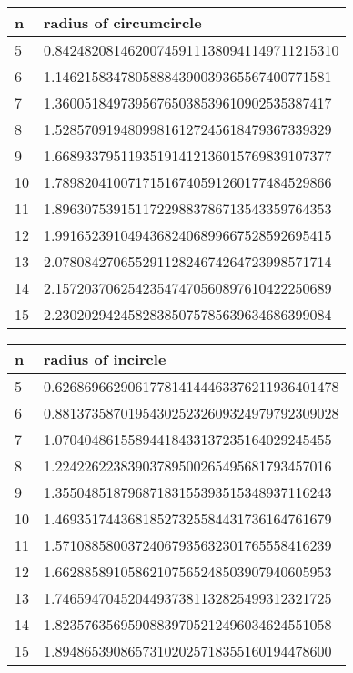 \documentclass[]{article}
\numberwithin{equation}{section}
\begin{document}
	\begin{table}[H]
		\begin{tabular}{|l|l|}
			\hline
			n  & radius of circumcircle                    \\ \hline
			5  & 0.842482081462007459111380941149711215310 \\ \hline
			6  & 1.14621583478058884390039365567400771581  \\ \hline
			7  & 1.36005184973956765038539610902535387417  \\ \hline
			8  & 1.52857091948099816127245618479367339329  \\ \hline
			9  & 1.66893379511935191412136015769839107377  \\ \hline
			10 & 1.78982041007171516740591260177484529866  \\ \hline
			11 & 1.89630753915117229883786713543359764353  \\ \hline
			12 & 1.99165239104943682406899667528592695415  \\ \hline
			13 & 2.07808427065529112824674264723998571714  \\ \hline
			14 & 2.15720370625423547470560897610422250689  \\ \hline
			15 & 2.23020294245828385075785639634686399084  \\ \hline
		\end{tabular}
	\end{table}
	
	\begin{table}[H]
		\begin{tabular}{|l|l|}
			\hline
			n  & radius of incircle                        \\ \hline
			5  & 0.626869662906177814144463376211936401478 \\ \hline
			6  & 0.881373587019543025232609324979792309028 \\ \hline
			7  & 1.07040486155894418433137235164029245455  \\ \hline
			8  & 1.22422622383903789500265495681793457016  \\ \hline
			9  & 1.35504851879687183155393515348937116243  \\ \hline
			10 & 1.46935174436818527325584431736164761679  \\ \hline
			11 & 1.57108858003724067935632301765558416239  \\ \hline
			12 & 1.66288589105862107565248503907940605953  \\ \hline
			13 & 1.74659470452044937381132825499312321725  \\ \hline
			14 & 1.82357635695908839705212496034624551058  \\ \hline
			15 & 1.89486539086573102025718355160194478600  \\ \hline
		\end{tabular}
	\end{table}
	
\end{document}
